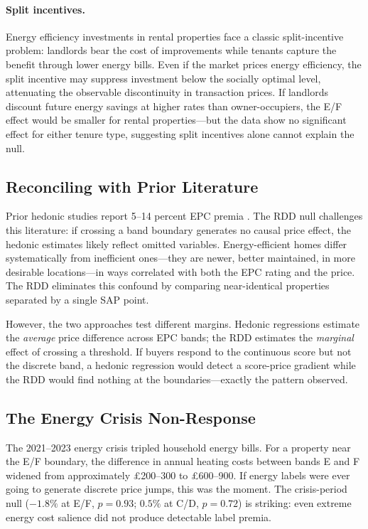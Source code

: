 \documentclass[12pt]{article}
\begin{document}
\paragraph{Split incentives.} Energy efficiency investments in rental properties face a classic split-incentive problem: landlords bear the cost of improvements while tenants capture the benefit through lower energy bills. Even if the market prices energy efficiency, the split incentive may suppress investment below the socially optimal level, attenuating the observable discontinuity in transaction prices. If landlords discount future energy savings at higher rates than owner-occupiers, the E/F effect would be smaller for rental properties---but the data show no significant effect for either tenure type, suggesting split incentives alone cannot explain the null.

\subsection{Reconciling with Prior Literature}

Prior hedonic studies report 5--14 percent EPC premia \citep{fuerst2015does, aydin2020capitalization}. The RDD null challenges this literature: if crossing a band boundary generates no causal price effect, the hedonic estimates likely reflect omitted variables. Energy-efficient homes differ systematically from inefficient ones---they are newer, better maintained, in more desirable locations---in ways correlated with both the EPC rating and the price. The RDD eliminates this confound by comparing near-identical properties separated by a single SAP point.

However, the two approaches test different margins. Hedonic regressions estimate the \textit{average} price difference across EPC bands; the RDD estimates the \textit{marginal} effect of crossing a threshold. If buyers respond to the continuous score but not the discrete band, a hedonic regression would detect a score-price gradient while the RDD would find nothing at the boundaries---exactly the pattern observed.

\subsection{The Energy Crisis Non-Response}

The 2021--2023 energy crisis tripled household energy bills. For a property near the E/F boundary, the difference in annual heating costs between bands E and F widened from approximately \pounds 200--300 to \pounds 600--900. If energy labels were ever going to generate discrete price jumps, this was the moment. The crisis-period null ($-1.8\%$ at E/F, $p = 0.93$; $0.5\%$ at C/D, $p = 0.72$) is striking: even extreme energy cost salience did not produce detectable label premia.
\end{document}
